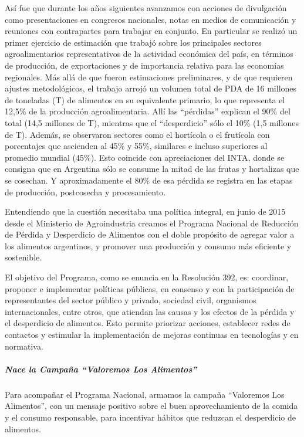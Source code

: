 \documentclass[
]{article}
\begin{document}
Así fue que durante los años siguientes avanzamos con acciones de
divulgación como presentaciones en congresos nacionales, notas en medios
de comunicación y reuniones con contrapartes para trabajar en conjunto.
En particular se realizó un primer ejercicio de estimación que trabajó
sobre los principales sectores agroalimentarios representativos de la
actividad económica del país, en términos de producción, de
exportaciones y de importancia relativa para las economías regionales.
Más allá de que fueron estimaciones preliminares, y de que requieren
ajustes metodológicos, el trabajo arrojó un volumen total de PDA de 16
millones de toneladas (T) de alimentos en su equivalente primario, lo
que representa el 12,5\% de la producción agroalimentaria. Allí las
``pérdidas'' explican el 90\% del total (14,5 millones de T), mientras
que el ``desperdicio'' sólo el 10\% (1,5 millones de T). Además, se
observaron sectores como el hortícola o el frutícola con porcentajes que
ascienden al 45\% y 55\%, similares e incluso superiores al promedio
mundial (45\%). Esto coincide con apreciaciones del INTA, donde se
consigna que en Argentina sólo se consume la mitad de las frutas y
hortalizas que se cosechan. Y aproximadamente el 80\% de esa pérdida se
registra en las etapas de producción, postcosecha y procesamiento.

Entendiendo que la cuestión necesitaba una política integral, en junio
de 2015 desde el Ministerio de Agroindustria creamos el Programa
Nacional de Reducción de Pérdida y Desperdicio de Alimentos con el doble
propósito de agregar valor a los alimentos argentinos, y promover una
producción y consumo más eficiente y sostenible.

El objetivo del Programa, como se enuncia en la Resolución 392, es:
coordinar, proponer e implementar políticas públicas, en consenso y con
la participación de representantes del sector público y privado,
sociedad civil, organismos internacionales, entre otros, que atiendan
las causas y los efectos de la pérdida y el desperdicio de alimentos.
Esto permite priorizar acciones, establecer redes de contactos y
estimular la implementación de mejoras continuas en tecnologías y en
normativa.

\hypertarget{nace-la-campauxf1a-valoremos-los-alimentos}{%
\subparagraph{Nace la Campaña ``Valoremos Los
Alimentos''}\label{nace-la-campauxf1a-valoremos-los-alimentos}}

Para acompañar el Programa Nacional, armamos la campaña ``Valoremos Los
Alimentos'', con un mensaje positivo sobre el buen aprovechamiento de la
comida y el consumo responsable, para incentivar hábitos que reduzcan el
desperdicio de alimentos.
\end{document}
